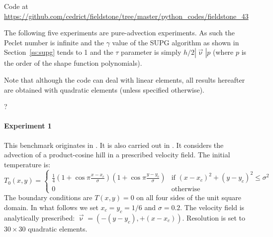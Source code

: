 
Code at \url{https://github.com/cedrict/fieldstone/tree/master/python_codes/fieldstone_43}

The following five experiments are pure-advection experiments. As such the Peclet number
is infinite and the $\gamma$ value of the SUPG algorithm as shown in Section~\ref{ss:supg} tends to 1
and the $\tau$ parameter is simply $h/2 |\vec\upnu| p$ (where $p$ is the order of the shape function polynomials).

Note that although the code can deal with linear elements, all results hereafter are obtained with quadratic elements (unless specified otherwise). 

?

\paragraph{Experiment 1}

This benchmark originates in \cite{dohu03}. It is also carried out in \cite{bepo10}.
It considers the advection of a product-cosine hill
in a prescribed velocity field. The initial temperature is:
\begin{equation}
T_0(x,y)=
\left\{
\begin{array}{cc}
\frac{1}{4}
\left(1+\cos \pi\frac{x-x_c}{\sigma}\right)
\left(1+\cos \pi\frac{y-y_c}{\sigma}\right)
& \text{if } (x-x_c)^2+(y-y_c)^2\leq \sigma^2 \\
0 & \text{otherwise}
\end{array}
\right.
\end{equation}
The boundary conditions are $T(x,y)=0$ on all four sides of the unit square domain. 
In what follows we set $x_c=y_c=1/6$ and $\sigma=0.2$.  
The velocity field is analytically prescribed: $\vec\upnu=(-(y-y_c),+(x-x_c))$.
Resolution is set to $30\times30$ quadratic elements.

